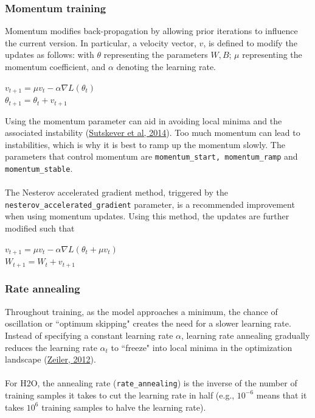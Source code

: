 \subsubsection{Momentum training}
\label{sssec:MomentumTraining}
Momentum modifies back-propagation by allowing prior iterations to influence the current version. In particular, a velocity vector, $v$, is defined to modify the updates as follows: with $\theta$ representing the parameters $W,B$; $\mu$ representing the momentum coefficient, and $\alpha$ denoting the learning rate. 
\begin{center}
$v_{t+1} = \mu v_t - \alpha \nabla L(\theta_t)$
\\
$\theta_{t+1} = \theta_t + v_{t+1}$
\end{center}
Using the momentum parameter can aid in avoiding 
local minima and the associated instability (\href{http://www.cs.toronto.edu/~fritz/absps/momentum.pdf}{Sutskever et al, 2014}). Too much momentum can lead to instabilities, which is why it is best to ramp up the momentum slowly.  The parameters that control momentum are \texttt{momentum\_start, momentum\_ramp} and \texttt{momentum\_stable}.
\\
\\
The Nesterov accelerated gradient method, triggered by the  \texttt{nesterov\_accelerated\_gradient} parameter, is a recommended improvement when using momentum updates. Using this method, the updates are further modified such that 
\begin{center}
$v_{t+1} = \mu v_t - \alpha \nabla L(\theta_t + \mu v_t)$
\\
$W_{t+1} = W_t + v_{t+1}$
\end{center}
\subsubsection{Rate annealing} 
\label{sssec:RateAnnealing}

Throughout training, as the model approaches a minimum, the chance of oscillation or ``optimum skipping" creates the need for a slower learning rate. Instead of specifying a constant learning rate $\alpha$, learning rate annealing gradually reduces the learning rate $\alpha_t$ to ``freeze" into local minima in the optimization landscape (\href{http://arxiv.org/pdf/1212.5701v1.pdf}{Zeiler, 2012}).  
\\
\\
For H2O, the annealing rate (\texttt{rate\_annealing}) is the inverse of the number of training samples it takes to cut the learning rate in half (e.g., $10^{-6}$ means that it takes $10^6$ training samples to halve the learning rate).

